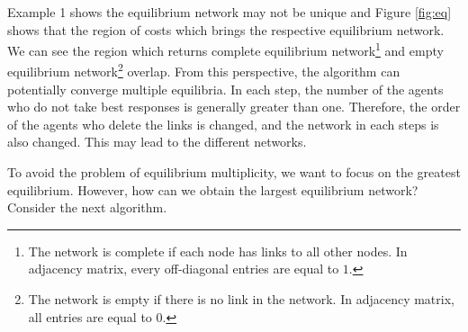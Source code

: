 \documentclass[12pt]{article}
\theoremstyle{definition}
\begin{document}
Example 1 shows the equilibrium network may not be unique and Figure \ref{fig:eq} shows that the region of costs which brings the respective equilibrium network.
We can see the region which returns complete equilibrium network\footnote{The network is complete if each node has links to all other nodes. In adjacency matrix, every off-diagonal entries are equal to $1$.} and empty equilibrium network\footnote{The network is empty if there is no link in the network. In adjacency matrix, all entries are equal to $0$.} overlap.
From this perspective, the algorithm can potentially converge multiple equilibria.
In each step, the number of the agents who do not take best responses is generally greater than one.
Therefore, the order of the agents who delete the links is changed, and the network in each steps is also changed.
This may lead to the different networks.

To avoid the problem of equilibrium multiplicity, we want to focus on the greatest equilibrium.
However, how can we obtain the largest equilibrium network?
Consider the next algorithm.
\end{document}
